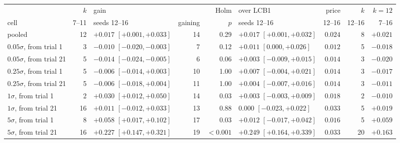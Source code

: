 \setlength{\tabcolsep}{3pt}
\begin{tabular}{lrlrrlrrr}
\toprule
 & $k$ & gain & & Holm & over LCB1 & price & $k$ & $k = 12$ \\
cell & 7--11 & seeds 12--16 & gaining & $p$ & seeds 12--16 & 12--16 & 12--16 & 7--16 \\
\midrule
pooled & 12 & $+0.017$ {\scriptsize $[+0.001, +0.033]$} & 14 & 0.29 & $+0.017$ {\scriptsize $[+0.001, +0.032]$} & $0.024$ & 8 & $+0.021$ \\
$0.05\sigma$, from trial 1 & 3 & $-0.010$ {\scriptsize $[-0.020, -0.003]$} & 7 & 0.12 & $+0.011$ {\scriptsize $[0.000, +0.026]$} & $0.012$ & 5 & $-0.018$ \\
$0.05\sigma$, from trial 21 & 5 & $-0.014$ {\scriptsize $[-0.024, -0.005]$} & 6 & 0.06 & $+0.003$ {\scriptsize $[-0.009, +0.015]$} & $0.014$ & 3 & $-0.020$ \\
$0.25\sigma$, from trial 1 & 5 & $-0.006$ {\scriptsize $[-0.014, +0.003]$} & 10 & 1.00 & $+0.007$ {\scriptsize $[-0.004, +0.021]$} & $0.014$ & 3 & $-0.017$ \\
$0.25\sigma$, from trial 21 & 5 & $-0.006$ {\scriptsize $[-0.018, +0.004]$} & 11 & 1.00 & $+0.004$ {\scriptsize $[-0.007, +0.016]$} & $0.014$ & 3 & $-0.011$ \\
$1\sigma$, from trial 1 & 2 & $+0.030$ {\scriptsize $[+0.012, +0.050]$} & 14 & 0.03 & $+0.003$ {\scriptsize $[-0.003, +0.009]$} & $0.018$ & 2 & $-0.010$ \\
$1\sigma$, from trial 21 & 16 & $+0.011$ {\scriptsize $[-0.012, +0.033]$} & 13 & 0.88 & $0.000$ {\scriptsize $[-0.023, +0.022]$} & $0.033$ & 5 & $+0.019$ \\
$5\sigma$, from trial 1 & 8 & $+0.058$ {\scriptsize $[+0.017, +0.102]$} & 17 & 0.03 & $+0.012$ {\scriptsize $[-0.017, +0.042]$} & $0.016$ & 5 & $+0.059$ \\
$5\sigma$, from trial 21 & 16 & $+0.227$ {\scriptsize $[+0.147, +0.321]$} & 19 & $<0.001$ & $+0.249$ {\scriptsize $[+0.164, +0.339]$} & $0.033$ & 20 & $+0.163$ \\
\bottomrule
\end{tabular}
